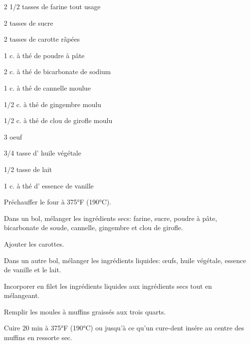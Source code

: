 


\totaltime{}


\begin{ingredients}
    \item 2 1/2 tasses de farine tout usage
    \item 2 tasses de sucre
    \item 2 tasses de carotte râpées
    \item 1 c. à thé de poudre à pâte
    \item 2 c. à thé de bicarbonate de sodium
    \item 1 c. à thé de cannelle moulue
    \item 1/2 c. à thé de gingembre moulu
    \item 1/2 c. à thé de clou de girofle moulu
    \item 3 oeuf
    \item 3/4 tasse d' huile végétale
    \item 1/2 tasse de lait
    \item 1 c. à thé d' essence de vanille
\end{ingredients}

\begin{steps}
    \item Préchauffer le four à 375°F (190°C).
    \item Dans un bol, mélanger les ingrédients secs: farine, sucre, poudre à pâte, bicarbonate de soude, cannelle, gingembre et clou de girofle.
    \item Ajouter les carottes.
    \item Dans un autre bol, mélanger les ingrédients liquides: œufs, huile végétale, essence de vanille et le lait.
    \item Incorporer en filet les ingrédients liquides aux ingrédients secs tout en mélangeant.
    \item Remplir les moules à muffins graissés aux trois quarts.
    \item Cuire 20 min à 375°F (190°C) ou jusqu'à ce qu'un cure-dent insére au centre des muffins en ressorte sec.
\end{steps}
